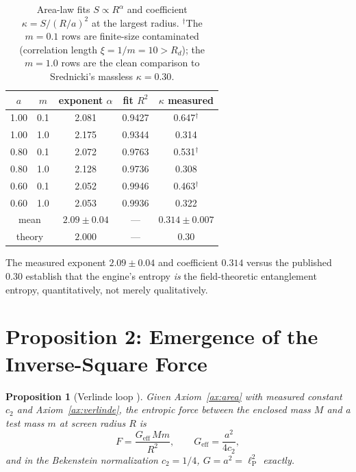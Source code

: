 \documentclass[11pt,a4paper]{article}
\newtheorem{proposition}{Proposition}
\theoremstyle{definition}
\theoremstyle{remark}
\begin{document}
\begin{table}[h]
\centering
\begin{tabular}{ccccc}
\toprule
$a$ & $m$ & exponent $\alpha$ & fit $R^2$ & $\kappa$ measured \\
\midrule
1.00 & 0.1 & 2.081 & 0.9427 & 0.647$^\dagger$ \\
1.00 & 1.0 & 2.175 & 0.9344 & 0.314 \\
0.80 & 0.1 & 2.072 & 0.9763 & 0.531$^\dagger$ \\
0.80 & 1.0 & 2.128 & 0.9736 & 0.308 \\
0.60 & 0.1 & 2.052 & 0.9946 & 0.463$^\dagger$ \\
0.60 & 1.0 & 2.053 & 0.9936 & 0.322 \\
\midrule
\multicolumn{2}{c}{mean} & $2.09 \pm 0.04$ & --- & $0.314 \pm 0.007$ \\
\multicolumn{2}{c}{theory \cite{Srednicki1993}} & $2.000$ & --- & $0.30$ \\
\bottomrule
\end{tabular}
\caption{Area-law fits $S \propto R^\alpha$ and coefficient
$\kappa = S/(R/a)^2$ at the largest radius. $^\dagger$The $m=0.1$ rows are
finite-size contaminated (correlation length $\xi = 1/m = 10 > R_d$); the
$m=1.0$ rows are the clean comparison to Srednicki's massless $\kappa=0.30$.}
\label{tab:arealaw}
\end{table}

The measured exponent $2.09 \pm 0.04$ and coefficient $0.314$ versus the
published $0.30$ establish that the engine's entropy \emph{is} the
field-theoretic entanglement entropy, quantitatively, not merely
qualitatively.

\section{Proposition 2: Emergence of the Inverse-Square Force}
\label{prop:force}

\begin{proposition}[Verlinde loop \cite{Verlinde2011}]
Given Axiom~\ref{ax:area} with measured constant $c_2$ and
Axiom~\ref{ax:verlinde}, the entropic force between the enclosed mass $M$ and
a test mass $m$ at screen radius $R$ is
\begin{equation}
F = \frac{G_{\mathrm{eff}}\, M m}{R^2},
\qquad
G_{\mathrm{eff}} = \frac{a^2}{4 c_2},
\end{equation}
and in the Bekenstein normalization $c_2 = 1/4$, $G = a^2 = \ell_{\mathrm P}^2$
exactly.
\end{proposition}
\end{document}
